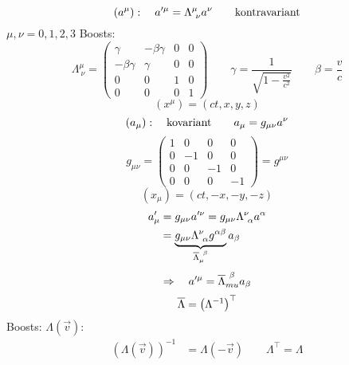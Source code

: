 \begin{equation*}
(a^{\mu}): \quad a'^{\mu} = \Lambda^{\mu}_{\ \nu} a^{\nu} \qquad \textrm{kontravariant}
\end{equation*}
$ \mu, \nu = 0, 1, 2, 3 $
%
%
%
%
%
%
Boosts:
\begin{equation*}
\Lambda^{\mu}_{\ \nu} = \begin{pmatrix}
\gamma & - \beta \gamma & 0 & 0 \\
- \beta \gamma & \gamma & 0 & 0 \\
0 & 0 & 1 & 0 \\
0 & 0 & 0 & 1
\end{pmatrix} \qquad \gamma = \frac{1}{\sqrt{1 - \frac{v^2}{c^2}}} \qquad \beta = \frac{v}{c}
\end{equation*}
\begin{equation*}
(x^{\mu}) = \left(ct, x, y, z\right)
\end{equation*}
\begin{equation*}
(a_{\mu}) : \quad \textrm{kovariant} \qquad a_{\mu} = g_{\mu \nu} a ^{\nu}
\end{equation*}
\begin{equation*}
g_{\mu \nu} = \begin{pmatrix}
1 & 0 & 0 & 0 \\
0 & -1 & 0 & 0 \\
0 & 0 & -1 & 0 \\
0 & 0 & 0 & -1
\end{pmatrix} = g^{\mu \nu}
\end{equation*}
\begin{equation*}
(x_{\mu}) = (ct, -x, -y, -z)
\end{equation*}
\begin{align*}
a'_{\mu} &= g_{\mu \nu} a'^{\nu} = g_{\mu \nu} \Lambda^{\nu} _{\ \alpha} a ^{\alpha}\\
&= \ub{g_{\mu \nu} \Lambda^{\nu}_{\ \alpha} g^{\alpha \beta}}_{\ol{\Lambda}_{\mu} ^{\ \beta}} a_{\beta}
\end{align*}
\begin{equation*}
\Rightarrow \quad a'^{\mu} = \overline{\Lambda}_{mu}^{\ \beta} a_{\beta}
\end{equation*}
\begin{equation*}
\overline{\Lambda} = \left(\Lambda^{-1}\right)^{\top}
\end{equation*}
Boosts: $ \Lambda(\vec{v}) $:
\begin{align*}
\left(\Lambda(\vec{v})\right)^{-1} &= \Lambda(-\vec{v}) \qquad \Lambda^{\top} = \Lambda
\end{align*}
